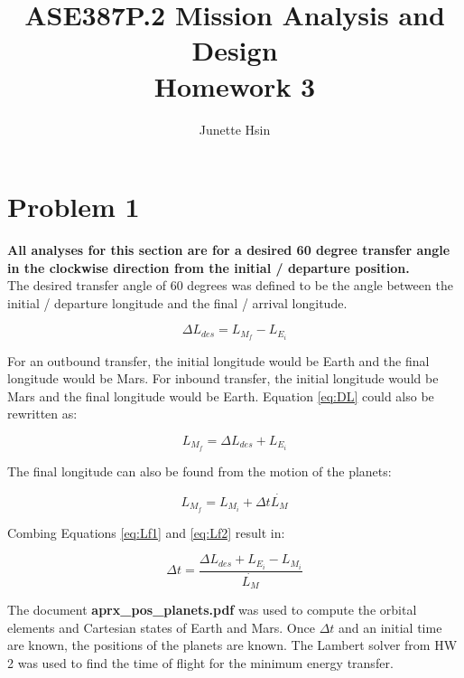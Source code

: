 \documentclass[conf]{new-aiaa}
\title{ASE387P.2 Mission Analysis and Design \\ Homework 3}
\author{Junette Hsin}
\affil{Masters Student, Aerospace Engineering and Engineering Mechanics, University of Texas, Austin, TX 78712}
\begin{document}
\maketitle




\section*{Problem 1}

\textbf{All analyses for this section are for a desired 60 degree transfer angle in the clockwise direction from the initial / departure position.} \\ 

The desired transfer angle of 60 degrees was defined to be the angle between the initial / departure longitude and the final / arrival longitude. 

\begin{equation}
    \Delta L_{des} = L_{M_f} - L_{E_i}
    \label{eq:DL}
\end{equation}

For an outbound transfer, the initial longitude would be Earth and the final longitude would be Mars. For inbound transfer, the initial longitude would be Mars and the final longitude would be Earth. Equation \ref{eq:DL} could also be rewritten as: 

\begin{equation}
    L_{M_f} = \Delta L_{des} + L_{E_i}
    \label{eq:Lf1}
\end{equation}

The final longitude can also be found from the motion of the planets: 

\begin{equation}
    L_{M_f} = L_{M_i} + \Delta t \dot{L_{M}}
    \label{eq:Lf2}
\end{equation}

Combing Equations \ref{eq:Lf1} and \ref{eq:Lf2} result in: 

\begin{equation}
    \Delta t = \frac{\Delta L_{des} + L_{E_i} - L_{M_i}}{ \dot{L_M} }
\end{equation}

The document \textbf{aprx\_pos\_planets.pdf} was used to compute the orbital elements and Cartesian states of Earth and Mars. Once $\Delta t$ and an initial time are known, the positions of the planets are known. The Lambert solver from HW 2 was used to find the time of flight for the minimum energy transfer. 
\end{document}
